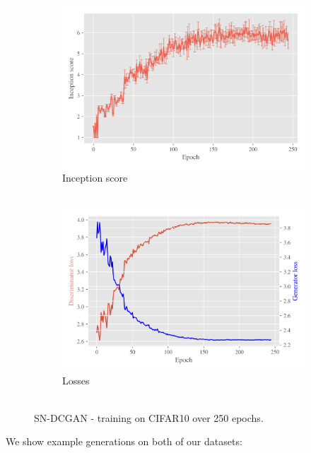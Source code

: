\begin{figure}[H]
    \centering
    \begin{subfigure}[t]{0.49\textwidth}
        \centering
		\includegraphics[width=\textwidth]{../code/results/figures/sndcgan_cifar10_is.png}
		\caption{Inception score\\~}
		\label{fig:exp-sndcgan-is}
    \end{subfigure}
    \begin{subfigure}[t]{0.49\textwidth}
        \centering
        \includegraphics[width=\textwidth]{../code/results/figures/sndcgan_cifar10_losses.png}
		\caption{Losses\\~}
		\label{fig:exp-sndcgan-losses}
    \end{subfigure}
    \caption{SN-DCGAN - training on CIFAR10 over 250 epochs.}
\end{figure}%
We show example generations on both of our datasets:
